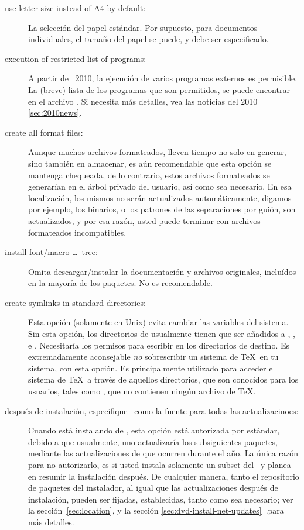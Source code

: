 \documentclass{article}
\begin{document}
\begin{description}
\item[use letter size instead of A4 by default:] La selección del
	papel estándar. Por supuesto, para documentos individuales, el
	tamaño del papel se puede, y debe ser especificado.  

\item[execution of restricted list of programs:] A partir de \TL\
	2010, la ejecución de varios programas externos es permisible.
	La (breve) lista de los programas que son permitidos, se puede
	encontrar en el archivo . Si necesita más
	detalles, vea las noticias del 2010 \ref{sec:2010news}.

\item[create all format files:] Aunque muchos archivos formateados,
	lleven tiempo no solo en generar, sino también en almacenar, es
	aún recomendable que esta opción se mantenga chequeada,
	de lo contrario, estos archivos formateados se
	generarían en el árbol privado del usuario, así como sea
	necesario. En esa localización, los mismos no serán
	actualizados automáticamente, digamos por ejemplo, los binarios,
	o los patrones de las separaciones por guión, son
	actualizados, y por esa razón, usted puede terminar con
	archivos formateados incompatibles. 

\item[install font/macro \ldots\ tree:] Omita descargar/instalar la
	documentación y archivos originales, incluídos en la mayoría de
	los paquetes. No es recomendable. 

\item[create symlinks in standard directories:] Esta opción (solamente
	en Unix) evita cambiar las variables del sistema. Sin esta
	opción, los directorios de \TL{} usualmente tienen que ser
	añadidos a , , e
	. Necesitaría los permisos para escribir en
	los directorios de destino. Es extremadamente aconsejable
	\emph{no} sobrescribir un sistema de \TeX\ en tu sistema, con
	esta opción. Es principalmente utilizado para acceder el
	sistema de \TeX\ a través de aquellos directorios, que son
	conocidos para los usuarios, tales como
	, que no contienen ningún archivo de
	\TeX.

\item[después de instalación, especifique \CTAN\ como la fuente para
	todas las actualizacinoes:] Cuando está instalando de \DVD, esta
	opción está autorizada por estándar, debido a que
	usualmente, uno actualizaría los subsiguientes paquetes,
	mediante las actualizaciones de \CTAN que ocurren
	durante el año. La única razón para no autorizarlo, es
	si usted instala solamente un subset del \DVD\ y planea
	en resumir la instalación después. De cualquier manera,
	tanto el repositorio de paquetes del instalador, al
	igual que las actualizaciones después de instalación,
	pueden ser fijadas, establecidas, tanto como sea
	necesario; ver la sección~\ref{sec:location}, y la
sección \ref{sec:dvd-install-net-updates}~.para más detalles.  
\end{description}
\end{document}
